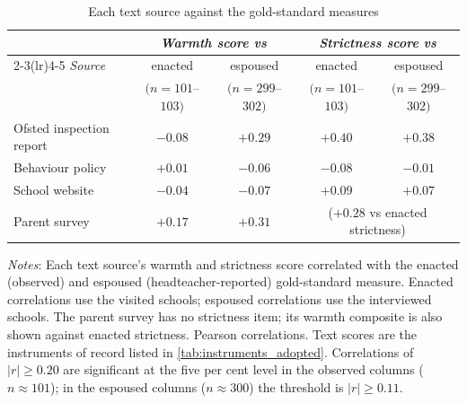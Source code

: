 \begin{table}[htbp]
\centering
\caption{Each text source against the gold-standard measures}
\label{tab:source_criterion}
\small
\begin{tabular}{lcccc}
\toprule
 & \multicolumn{2}{c}{\textit{Warmth score vs}} & \multicolumn{2}{c}{\textit{Strictness score vs}} \\
\cmidrule(lr){2-3}\cmidrule(lr){4-5}
\textit{Source} & enacted & espoused & enacted & espoused \\
 & $(n = 101$--$103)$ & $(n = 299$--$302)$ & $(n = 101$--$103)$ & $(n = 299$--$302)$ \\
\midrule
Ofsted inspection report & $-0.08$ & $+0.29$ & $+0.40$ & $+0.38$ \\
Behaviour policy         & $+0.01$ & $-0.06$ & $-0.08$ & $-0.01$ \\
School website           & $-0.04$ & $-0.07$ & $+0.09$ & $+0.07$ \\
Parent survey            & $+0.17$ & $+0.31$ & \multicolumn{2}{c}{($+0.28$ vs enacted strictness)} \\
\bottomrule
\end{tabular}
\begin{minipage}{0.86\linewidth}
\vspace{4pt}\scriptsize
\textit{Notes}: Each text source's warmth and strictness score correlated with the enacted (observed) and espoused (headteacher-reported) gold-standard measure. Enacted correlations use the visited schools; espoused correlations use the interviewed schools. The parent survey has no strictness item; its warmth composite is also shown against enacted strictness. Pearson correlations. Text scores are the instruments of
record listed in \cref{tab:instruments_adopted}. Correlations of $|r| \geq 0.20$ are
significant at the five per cent level in the observed columns ($n \approx 101$);
in the espoused columns ($n \approx 300$) the threshold is $|r| \geq 0.11$.
\end{minipage}
\end{table}
